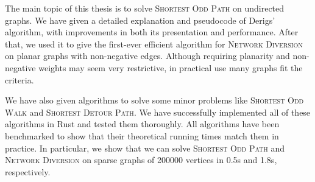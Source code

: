 The main topic of this thesis is to solve \textsc{Shortest Odd Path} on undirected graphs. We have given a detailed explanation and pseudocode of Derigs' \cite{source:derigs_shortest_odd_path} algorithm, with improvements in both its presentation and performance. After that, we used it to give the first-ever efficient algorithm for \textsc{Network Diversion} on planar graphs with non-negative edges. Although requiring planarity and non-negative weights may seem very restrictive, in practical use many graphs fit the criteria.

We have also given algorithms to solve some minor problems like \textsc{Shortest Odd Walk} and \textsc{Shortest Detour Path}. We have successfully implemented all of these algorithms in Rust and tested them thoroughly. All algorithms have been benchmarked to show that their theoretical running times match them in practice. In particular, we show that we can solve \textsc{Shortest Odd Path} and \textsc{Network Diversion} on sparse graphs of 200000 vertices in 0.5s and 1.8s, respectively.
